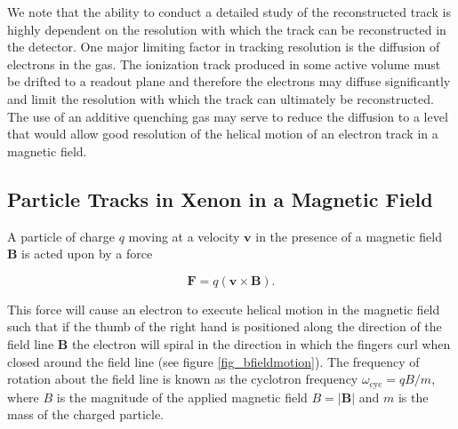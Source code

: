 \documentclass{JINST}
\begin{document}
We note that the ability to conduct a detailed study of the reconstructed track is highly dependent on the resolution
with which the track can be reconstructed in the detector.  One major limiting factor in tracking resolution is the diffusion
of electrons in the gas.  The ionization track produced in some active volume must be drifted to a readout plane and 
therefore the electrons may diffuse significantly and limit the resolution with which the track can ultimately be
reconstructed.  The use of an additive quenching gas may serve to reduce the diffusion to a level that would allow
good resolution of the helical motion of an electron track in a magnetic field.


\subsection{Particle Tracks in Xenon in a Magnetic Field}\label{ssec:magmotion}
A particle of charge $q$ moving at a velocity $\mathbf{v}$ in the presence of a magnetic field $\mathbf{B}$ is acted 
upon by a force

\begin{equation}
\mathbf{F} = q(\mathbf{v} \times \mathbf{B}).
\end{equation}

This force will cause an electron to execute helical motion in the magnetic field such that if the thumb of the right hand is positioned along the direction of the field line $\mathbf{B}$ the electron will spiral in the direction in which the fingers curl when closed around the field line (see figure \ref{fig_bfieldmotion}).  The frequency of rotation about the field line is known as the cyclotron frequency $\omega_{\mathrm{cyc}} = qB/m$, where $B$ is the magnitude of the applied magnetic field $B = |\mathbf{B}|$ and $m$ is the mass of the charged particle.
\end{document}
